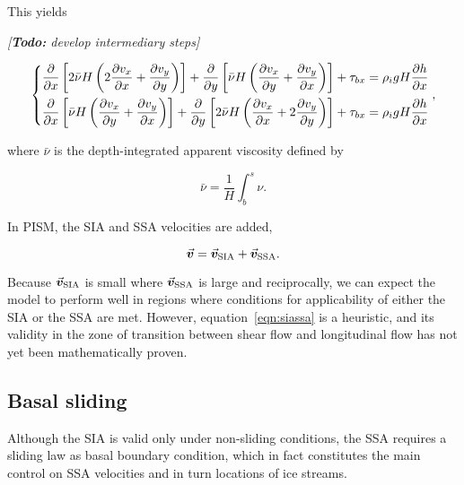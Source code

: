 \documentclass{article}
\newcommand{\todo}[1]{\emph{[\textbf{Todo:} #1]}}
\newcommand{\vect}[1]{\va*{#1}} %
\newcommand{\vv}[0]{\vect{v}}           %
\newcommand{\vsia}[0]{\vv_{\mathrm{SIA}}}   %
\newcommand{\vssa}[0]{\vv_{\mathrm{SSA}}}   %
\begin{document}
This yields

\todo{develop intermediary steps}

\begin{equation}
    \left\{\begin{aligned}
        \pdv{x} \left[2\bar{\nu}H
                      \left(2\pdv{v_x}{x} + \pdv{v_y}{y}\right) \right]
            + \pdv{y} \left[\bar{\nu}H
                            \left(\pdv{v_x}{y} + \pdv{v_y}{x}\right) \right]
            + \tau_{bx} &= \rho_i gH \pdv{h}{x} \\
        \pdv{x} \left[\bar{\nu}H
                      \left(\pdv{v_x}{y} + \pdv{v_y}{x}\right) \right]
            + \pdv{y} \left[2\bar{\nu}H
                            \left(\pdv{v_x}{x} + 2\pdv{v_y}{y}\right) \right]
            + \tau_{bx} &= \rho_i gH \pdv{h}{x} \\
    \end{aligned}\right.,
\end{equation}

where $\bar{\nu}$ is the depth-integrated apparent viscosity defined by

\begin{equation}
    \bar{\nu} = \frac{1}{H}\int_b^s\nu.
\end{equation}

In PISM, the SIA and SSA velocities are added,

\begin{equation}
    \label{eqn:siassa}
    \vv = \vsia + \vssa.
\end{equation}

Because $\vsia$ is small where $\vssa$ is large and
reciprocally, we can expect the model to perform well in regions where
conditions for applicability of either the SIA or the SSA are met. However,
equation~\ref{eqn:siassa} is a heuristic, and its validity in the zone of
transition between shear flow and longitudinal flow has not yet been
mathematically proven.

\subsection{Basal sliding}

Although the SIA is valid only under non-sliding conditions, the SSA requires
a sliding law as basal boundary condition, which in fact constitutes the main
control on SSA velocities and in turn locations of ice streams.
\end{document}

